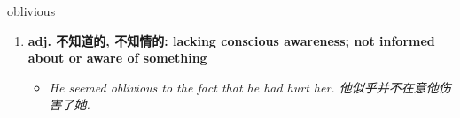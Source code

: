 
\begin{frame}
{\huge oblivious}
\begin{center}
\begin{enumerate}\Large
  \item \textbf{adj. 不知道的, 不知情的: lacking conscious awareness; not informed about or aware of something}
  \begin{itemize}
    \item \em{\Large{He seemed oblivious to the fact that he had hurt her. 他似乎并不在意他伤害了她.}}
  \end{itemize}
\end{enumerate}
\end{center}
\end{frame}

